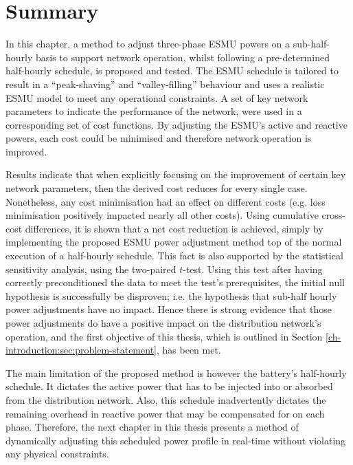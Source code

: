 \section{Summary}
\label{ch1:sec:summary}

In this chapter, a method to adjust three-phase ESMU powers on a sub-half-hourly basis to support network operation, whilst following a pre-determined half-hourly schedule, is proposed and tested.
The ESMU schedule is tailored to result in a ``peak-shaving'' and ``valley-filling'' behaviour and uses a realistic ESMU model to meet any operational constraints.
A set of key network parameters to indicate the performance of the network, were used in a corresponding set of cost functions.
By adjusting the ESMU's active and reactive powers, each cost could be minimised and therefore network operation is improved.

Results indicate that when explicitly focusing on the improvement of certain key network parameters, then the derived cost reduces for every single case.
Nonetheless, any cost minimisation had an effect on different costs (e.g. loss minimisation positively impacted nearly all other costs).
Using cumulative cross-cost differences, it is shown that a net cost reduction is achieved, simply by implementing the proposed ESMU power adjustment method top of the normal execution of a half-hourly schedule.
This fact is also supported by the statistical sensitivity analysis, using the two-paired $t$-test.
Using this test after having correctly preconditioned the data to meet the test's prerequisites, the initial null hypothesis is successfully be disproven; i.e. the hypothesis that sub-half hourly power adjustments have no impact.
Hence there is strong evidence that those power adjustments do have a positive impact on the distribution network's operation, and the first objective of this thesis, which is outlined in Section \ref{ch-introduction:sec:problem-statement}, has been met.

The main limitation of the proposed method is however the battery's half-hourly schedule.
It dictates the active power that has to be injected into or absorbed from the distribution network.
Also, this schedule inadvertently dictates the remaining overhead in reactive power that may be compensated for on each phase.
Therefore, the next chapter in this thesis presents a method of dynamically adjusting this scheduled power profile in real-time without violating any physical constraints.
